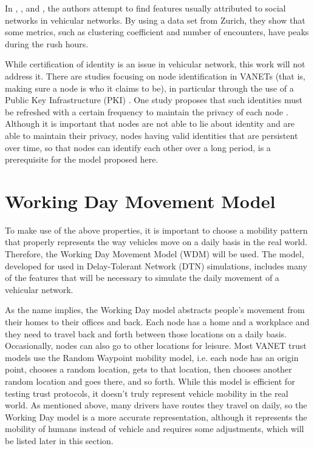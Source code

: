 In \cite{da2013effective}, \cite{cunha2014vehicular}, and \cite{cunha2014possible}, the authors attempt to find features usually attributed to social networks in vehicular networks.
By using a data set from Zurich, they show that some metrics, such as clustering coefficient and number of encounters, have peaks during the rush hours.


While certification of identity is an issue in vehicular network, this work will not address it.
There are studies focusing on node identification in VANETs (that is, making sure a node is who it claims to be), in particular through the use of a Public Key Infrastructure (PKI) \cite{wasef2010complementing} 
\cite{kumar2015intelligent}.
One study proposes that such identities must be refreshed with a certain frequency to maintain the privacy of each node \cite{golle2004detecting}.
Although it is important that nodes are not able to lie about identity and are able to maintain their privacy, nodes having valid identities that are persistent over time, so that nodes can identify each other over a long period, is a prerequisite for the model proposed here.

\section{Working Day Movement Model}
\label{section:workingday}

To make use of the above properties, it is important to choose a mobility pattern that properly represents the way vehicles move on a daily basis in the real world.
Therefore, the Working Day Movement Model \cite{ekman2008working} (WDM) will be used.
The model, developed for used in Delay-Tolerant Network (DTN) simulations, includes many of the features that will be necessary to simulate the daily movement of a vehicular network.

As the name implies, the Working Day model abstracts people's movement from their homes to their offices and back.
Each node has a home and a workplace and they need to travel back and forth between those locations on a daily basis.
Occasionally, nodes can also go to other locations for leisure.
Most VANET trust models use the Random Waypoint mobility model, i.e. each node has an origin point, chooses a random location, gets to that location, then chooses another random location and goes there, and so forth.
While this model is efficient for testing trust protocols, it doesn't truly represent vehicle mobility in the real world.
As mentioned above, many drivers have routes they travel on daily, so the Working Day model is a more accurate representation, although it represents the mobility of humans instead of vehicle and requires some adjustments, which will be listed later in this section.

